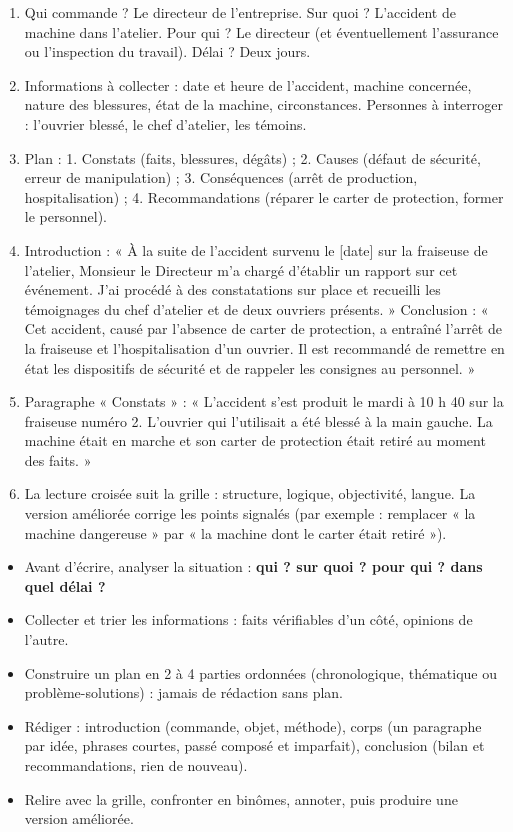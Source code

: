\documentclass[11pt]{article}
\begin{document}
\begin{corrige}
\begin{enumerate}
\item Qui commande ? Le directeur de l'entreprise. Sur quoi ? L'accident de machine dans l'atelier. Pour qui ? Le directeur (et éventuellement l'assurance ou l'inspection du travail). Délai ? Deux jours.
\item Informations à collecter : date et heure de l'accident, machine concernée, nature des blessures, état de la machine, circonstances. Personnes à interroger : l'ouvrier blessé, le chef d'atelier, les témoins.
\item Plan : 1. Constats (faits, blessures, dégâts) ; 2. Causes (défaut de sécurité, erreur de manipulation) ; 3. Conséquences (arrêt de production, hospitalisation) ; 4. Recommandations (réparer le carter de protection, former le personnel).
\item Introduction : « À la suite de l'accident survenu le [date] sur la fraiseuse de l'atelier, Monsieur le Directeur m'a chargé d'établir un rapport sur cet événement. J'ai procédé à des constatations sur place et recueilli les témoignages du chef d'atelier et de deux ouvriers présents. » Conclusion : « Cet accident, causé par l'absence de carter de protection, a entraîné l'arrêt de la fraiseuse et l'hospitalisation d'un ouvrier. Il est recommandé de remettre en état les dispositifs de sécurité et de rappeler les consignes au personnel. »
\item Paragraphe « Constats » : « L'accident s'est produit le mardi à 10 h 40 sur la fraiseuse numéro 2. L'ouvrier qui l'utilisait a été blessé à la main gauche. La machine était en marche et son carter de protection était retiré au moment des faits. »
\item La lecture croisée suit la grille : structure, logique, objectivité, langue. La version améliorée corrige les points signalés (par exemple : remplacer « la machine dangereuse » par « la machine dont le carter était retiré »).
\end{enumerate}
\end{corrige}

\begin{aretenir}
\begin{itemize}
\item Avant d'écrire, analyser la situation : \textbf{qui ? sur quoi ? pour qui ? dans quel délai ?}
\item Collecter et trier les informations : faits vérifiables d'un côté, opinions de l'autre.
\item Construire un plan en 2 à 4 parties ordonnées (chronologique, thématique ou problème-solutions) : jamais de rédaction sans plan.
\item Rédiger : introduction (commande, objet, méthode), corps (un paragraphe par idée, phrases courtes, passé composé et imparfait), conclusion (bilan et recommandations, rien de nouveau).
\item Relire avec la grille, confronter en binômes, annoter, puis produire une version améliorée.
\end{itemize}
\end{aretenir}
\end{document}
